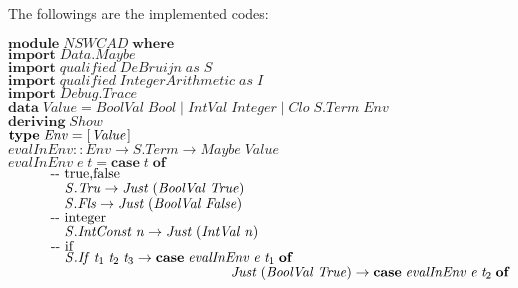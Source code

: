 \documentclass[10pt]{article}
\newcommand{\Conid}[1]{\mathit{#1}}
\newcommand{\Varid}[1]{\mathit{#1}}
\begin{document}
The followings are the implemented codes:\\
\begin{hscode}\SaveRestoreHook
${\mathbf{module}\;\Conid{NSWCAD}\;\mathbf{where}}$\\
${\mathbf{import}\;\Conid{\Conid{Data}.Maybe}}$\\
${\mathbf{import}\;\Varid{qualified}\;\Conid{DeBruijn}\;\Varid{as}\;\Conid{S}}$\\
${\mathbf{import}\;\Varid{qualified}\;\Conid{IntegerArithmetic}\;\Varid{as}\;\Conid{I}}$\\
${\mathbf{import}\;\Conid{\Conid{Debug}.Trace}}$\\
${}$\\
${\mathbf{data}\;\Conid{Value}\mathrel{=}\Conid{BoolVal}\;\Conid{Bool}\mid \Conid{IntVal}\;\Conid{Integer}\mid \Conid{Clo}\;\Conid{\Conid{S}.Term}\;\Conid{Env}}$\\
${\mathbf{deriving}\;\Conid{Show}}$\\
${}$\\
${\mathbf{type}\;\Conid{Env}\mathrel{=}[\mskip1.5mu \Conid{Value}\mskip1.5mu]}$\\
${}$\\
${\Varid{evalInEnv}\mathbin{::}\Conid{Env}\to \Conid{\Conid{S}.Term}\to \Conid{Maybe}\;\Conid{Value}}$\\
${\Varid{evalInEnv}\;\Varid{e}\;\Varid{t}\mathrel{=}\mathbf{case}\;\Varid{t}\;\mathbf{of}}$\\
${\hskip1.00em\relax\mbox{\qquad-{}-  true,false}}$\\
${\hskip1.00em\relax\hskip3.00em\relax\Conid{\Conid{S}.Tru}\to \Conid{Just}\;(\Conid{BoolVal}\;\Conid{True})}$\\
${\hskip1.00em\relax\hskip3.00em\relax\Conid{\Conid{S}.Fls}\to \Conid{Just}\;(\Conid{BoolVal}\;\Conid{False})}$\\
${\hskip1.00em\relax\mbox{\qquad-{}-  integer}}$\\
${\hskip1.00em\relax\hskip3.00em\relax\Conid{\Conid{S}.IntConst}\;\Varid{n}\to \Conid{Just}\;(\Conid{IntVal}\;\Varid{n})}$\\
${\hskip1.00em\relax\mbox{\qquad-{}-  if}}$\\
${\hskip1.00em\relax\hskip3.00em\relax\Conid{\Conid{S}.If}\;\Varid{t}_{1}\;\Varid{t}_{2}\;\Varid{t}_{3}\to \mathbf{case}\;\Varid{evalInEnv}\;\Varid{e}\;\Varid{t}_{1}\;\mathbf{of}}$\\
${\hskip1.00em\relax\hskip3.00em\relax\hskip12.00em\relax\Conid{Just}\;(\Conid{BoolVal}\;\Conid{True})\to \mathbf{case}\;\Varid{evalInEnv}\;\Varid{e}\;\Varid{t}_{2}\;\mathbf{of}}$\\

\end{hscode}
\end{document}
